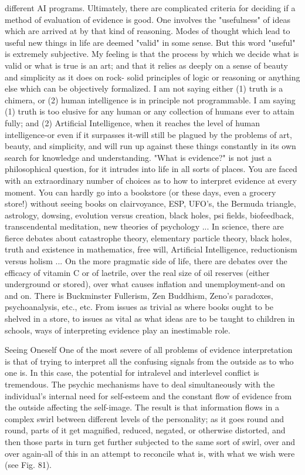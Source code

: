different AI programs. Ultimately, there are complicated criteria for deciding if a method
of evaluation of evidence is good. One involves the "usefulness" of ideas which are
arrived at by that kind of reasoning. Modes of thought which lead to useful new things in
life are deemed "valid" in some sense. But this word "useful" is extremely subjective.
         My feeling is that the process by which we decide what is valid or what is true is
an art; and that it relies as deeply on a sense of beauty and simplicity as it does on rock-
solid principles of logic or reasoning or anything else which can be objectively
formalized. I am not saying either (1) truth is a chimera, or (2) human intelligence is in
principle not programmable. I am saying (1) truth is too elusive for any human or any
collection of humans ever to attain fully; and (2) Artificial Intelligence, when it reaches
the level of human intelligence-or even if it surpasses it-will still be plagued by the
problems of art, beauty, and simplicity, and will run up against these things constantly in
its own search for knowledge and understanding.
         "What is evidence?" is not just a philosophical question, for it intrudes into life in
all sorts of places. You are faced with an extraordinary number of choices as to how to
interpret evidence at every moment. You can hardly go into a bookstore (or these days,
even a grocery store!) without seeing books on clairvoyance, ESP, UFO's, the Bermuda
triangle, astrology, dowsing, evolution versus creation, black holes, psi fields,
biofeedback, transcendental meditation, new theories of psychology ... In science, there
are fierce debates about catastrophe theory, elementary particle theory, black holes, truth
and existence in mathematics, free will, Artificial Intelligence, reductionism versus
holism ... On the more pragmatic side of life, there are debates over the efficacy of
vitamin C or of laetrile, over the real size of oil reserves (either underground or stored),
over what causes inflation and unemployment-and on and on. There is Buckminster
Fullerism, Zen Buddhism, Zeno's paradoxes, psychoanalysis, etc., etc. From issues as
trivial as where books ought to be shelved in a store, to issues as vital as what ideas are to
be taught to children in schools, ways of interpreting evidence play an inestimable role.

                                     Seeing Oneself
One of the most severe of all problems of evidence interpretation is that of trying to
interpret all the confusing signals from the outside as to who one is. In this case, the
potential for intralevel and interlevel conflict is tremendous. The psychic mechanisms
have to deal simultaneously with the individual's internal need for self-esteem and the
constant flow of evidence from the outside affecting the self-image. The result is that
information flows in a complex swirl between different levels of the personality; as it
goes round and round, parts of it get magnified, reduced, negated, or otherwise distorted,
and then those parts in turn get further subjected to the same sort of swirl, over and over
again-all of this in an attempt to reconcile what is, with what we wish were (see Fig. 81).




